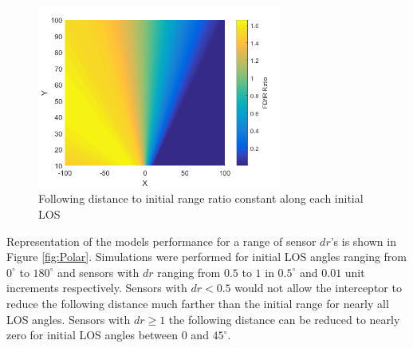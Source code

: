 \documentclass[conference]{IEEEtran}
\providecommand{\DIFdelbegin}{} %
\providecommand{\DIFdelend}{} %
\newcommand{\DIFscaledelfig}{0.5}
\newlength{\DIFdelgraphicswidth} %
\newlength{\DIFdelgraphicsheight} %
\newcommand{\DIFdelincludegraphics}[2][]{%
\sbox{\DIFdelgraphicsbox}{\DIFOincludegraphics[#1]{#2}}%
\settoboxwidth{\DIFdelgraphicswidth}{\DIFdelgraphicsbox} %
\settoboxtotalheight{\DIFdelgraphicsheight}{\DIFdelgraphicsbox} %
\scalebox{\DIFscaledelfig}{%
\parbox[b]{\DIFdelgraphicswidth}{\usebox{\DIFdelgraphicsbox}\\[-\baselineskip] \rule{\DIFdelgraphicswidth}{0em}}\llap{\resizebox{\DIFdelgraphicswidth}{\DIFdelgraphicsheight}{%
\setlength{\unitlength}{\DIFdelgraphicswidth}%
\begin{picture}(1,1)%
\thicklines\linethickness{2pt} %
{\color[rgb]{1,0,0}\put(0,0){\framebox(1,1){}}}%
{\color[rgb]{1,0,0}\put(0,0){\line( 1,1){1}}}%
{\color[rgb]{1,0,0}\put(0,1){\line(1,-1){1}}}%
\end{picture}%
}\hspace*{3pt}}} %
} %
\DeclareRobustCommand{\DIFdelbegin}{\DIFOdelbegin \let\includegraphics\DIFdelincludegraphics} %
\DeclareRobustCommand{\DIFdelend}{\DIFOaddend \let\includegraphics\DIFOincludegraphics} %
\begin{document}
\DIFdelbegin %


\DIFdelend \begin{figure}[H]
	\centering
	\includegraphics[width=8cm]{FDIR_Rays.png}
	\caption{Following distance to initial range ratio constant along each initial LOS}
	\label{fig:Rays}
\end{figure}

Representation of the models performance for a range of sensor $dr$'s is shown in Figure \ref{fig:Polar}. Simulations were performed for initial LOS angles ranging from $0^{\circ}$ to $180^{\circ}$ and sensors with $dr$ ranging from $0.5$ to $1$ in $0.5^{\circ}$ and $0.01$ unit increments respectively. Sensors with $dr < 0.5$ would not allow the interceptor to reduce the following distance much farther than the initial range for nearly all LOS angles. Sensors with $dr \geq 1$ the following distance can be reduced to nearly zero for initial LOS angles between $0$ and $45^{\circ}$. 
\end{document}
